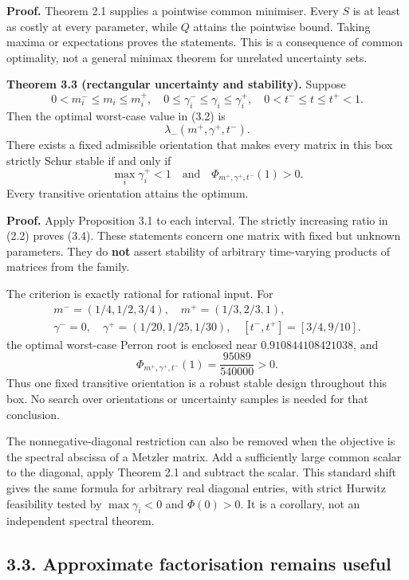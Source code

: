 \documentclass[
  11pt,
  a4paper,
]{article}
\begin{document}
\textbf{Proof.} Theorem 2.1 supplies a pointwise common minimiser. Every
\(S\) is at least as costly at every parameter, while \(Q\) attains the
pointwise bound. Taking maxima or expectations proves the statements.
This is a consequence of common optimality, not a general minimax
theorem for unrelated uncertainty sets.

\textbf{Theorem 3.3 (rectangular uncertainty and stability).} Suppose \[
 0<m_i^-\le m_i\le m_i^+,\quad
 0\le\gamma_i^-\le\gamma_i\le\gamma_i^+,\quad
 0<t^-\le t\le t^+<1.
\] Then the optimal worst-case value in (3.2) is
\[\lambda_-(m^+,\gamma^+,t^-).                              \tag{3.3}\]
There exists a fixed admissible orientation that makes every matrix in this box strictly
Schur stable if and only if \[\max_i\gamma_i^+<1\quad\text{and}\quad
 \Phi_{m^+,\gamma^+,t^-}(1)>0.                              \tag{3.4}\]
Every transitive orientation attains the optimum.

\textbf{Proof.} Apply Proposition 3.1 to each interval. The strictly
increasing ratio in (2.2) proves (3.4). These statements concern one
matrix with fixed but unknown parameters. They do \textbf{not} assert
stability of arbitrary time-varying products of matrices from the
family.

The criterion is exactly rational for rational input. For \[
\begin{gathered}
 m^-=(1/4,1/2,3/4),\quad m^+=(1/3,2/3,1),\\
 \gamma^-=0,\quad\gamma^+=(1/20,1/25,1/30),\quad
 [t^-,t^+]=[3/4,9/10].
\end{gathered}
\] the optimal worst-case Perron root is enclosed near
\(0.910844108421038\), and
\[\Phi_{m^+,\gamma^+,t^-}(1)=\frac{95089}{540000}>0.          \tag{3.5}\]
Thus one fixed transitive orientation is a robust stable design
throughout this box. No search over orientations or uncertainty samples
is needed for that conclusion.

The nonnegative-diagonal restriction can also be removed when the
objective is the spectral abscissa of a Metzler matrix. Add a
sufficiently large common scalar to the diagonal, apply Theorem 2.1 and
subtract the scalar. This standard shift gives the same formula for
arbitrary real diagonal entries, with strict Hurwitz feasibility tested
by \(\max\gamma_i<0\) and \(\Phi(0)>0\). It is a corollary, not an
independent spectral theorem.

\subsection{3.3. Approximate factorisation remains
useful}\label{approximate-factorisation-remains-useful}
\end{document}
